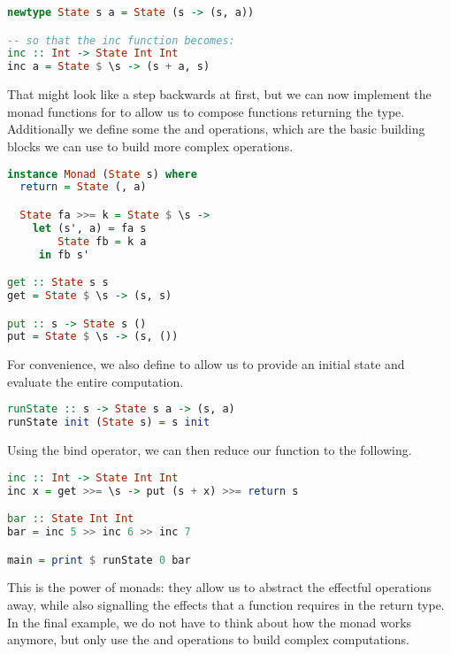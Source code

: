 \begin{lstlisting}[language=haskell,style=fancy]
newtype State s a = State (s -> (s, a))

-- so that the inc function becomes:
inc :: Int -> State Int Int
inc a = State $ \s -> (s + a, s)
\end{lstlisting}

That might look like a step backwards at first, but we can now implement the monad functions for  to allow us to compose functions returning the  type. Additionally we define some the  and  operations, which are the basic building blocks we can use to build more complex operations.

\begin{lstlisting}[language=haskell,style=fancy]
instance Monad (State s) where
  return = State (, a)

  State fa >>= k = State $ \s ->
    let (s', a) = fa s
        State fb = k a
     in fb s'

get :: State s s
get = State $ \s -> (s, s)

put :: s -> State s ()
put = State $ \s -> (s, ())
\end{lstlisting}

For convenience, we also define  to allow us to provide an initial state and evaluate the entire computation.

\begin{lstlisting}[language=haskell,style=fancy]
runState :: s -> State s a -> (s, a)
runState init (State s) = s init
\end{lstlisting}

Using the bind operator, we can then reduce our  function to the following.

\begin{lstlisting}[language=haskell,style=fancy]
inc :: Int -> State Int Int
inc x = get >>= \s -> put (s + x) >>= return s

bar :: State Int Int
bar = inc 5 >> inc 6 >> inc 7

main = print $ runState 0 bar
\end{lstlisting}

This is the power of monads: they allow us to abstract the effectful operations away, while also signalling the effects that a function requires in the return type. In the final example, we do not have to think about how the  monad works anymore, but only use the  and  operations to build complex computations.

